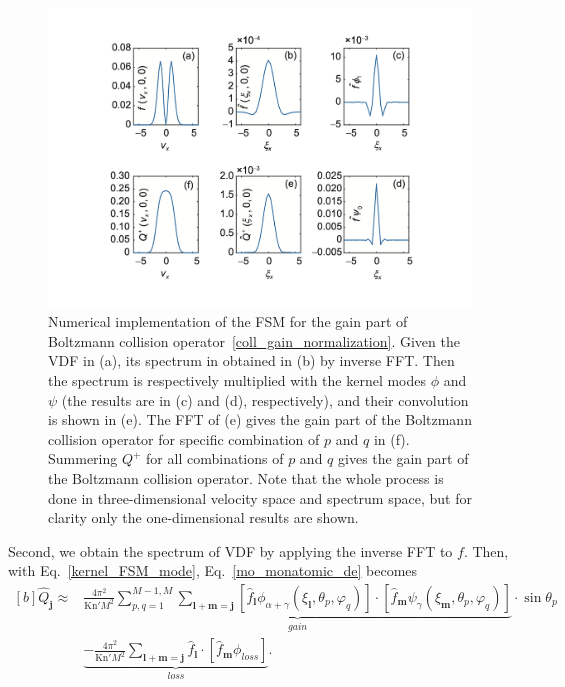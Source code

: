 \begin{figure}[t]
	\centering
	\includegraphics[scale=0.5]{Chapter4/IMG/FSM_demo.pdf}
	\caption{
		Numerical implementation of the FSM for the gain part of Boltzmann collision operator~\eqref{coll_gain_normalization}. Given the VDF in (a), its spectrum in obtained in (b) by inverse FFT. Then the spectrum is respectively multiplied with the kernel modes $\phi$ and $\psi$ (the results are in (c) and (d), respectively), and their convolution is shown in (e). The FFT of (e) gives the gain part of the Boltzmann collision operator for specific combination of $p$ and $q$ in (f). Summering $Q^+$ for all combinations of $p$ and $q$ gives the gain part of the Boltzmann collision operator. Note that the whole process is done in three-dimensional velocity space and spectrum space, but for clarity only the one-dimensional results are shown.
	  }
	\label{FSM_demo}
\end{figure}


Second, we obtain the spectrum of VDF by applying the inverse FFT to $f$. Then, with Eq.~\eqref{kernel_FSM_mode}, Eq.~\eqref{mo_monatomic_de} becomes 
\begin{equation*}
\begin{aligned}[b]
  \widehat{Q}_{\bm{j}}\approx &\underbrace{\frac{4\pi^2}{\text{Kn}'M^2}\sum_{p,q=1}^{M-1,M} \sum_{\bm{l}+\bm{m}=\bm{j} }[\hat{f}_{\bm{l}}{\phi_{\alpha+\gamma}(\xi_{\bm{l}},\theta_p,\varphi_q)}]\cdot[\hat{f}_{\bm{m}}{\psi_{\gamma}(\xi_{\bm{m}},\theta_p,\varphi_q)}]}_{gain}\cdot\sin\theta_p
  \\
  &\underbrace{-\frac{4\pi^2}{\text{Kn}'M^2}\sum_{\bm{l}+\bm{m}=\bm{j} }\hat{f}_{\bm{l}}\cdot[\hat{f}_{\bm{m}}{\phi_{loss}}]}_{loss}.
\end{aligned}
\end{equation*}

